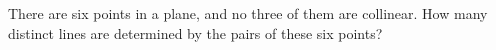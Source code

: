 There are six points in a plane, and no three of them are collinear. How many distinct lines are determined by the pairs of these six points?
